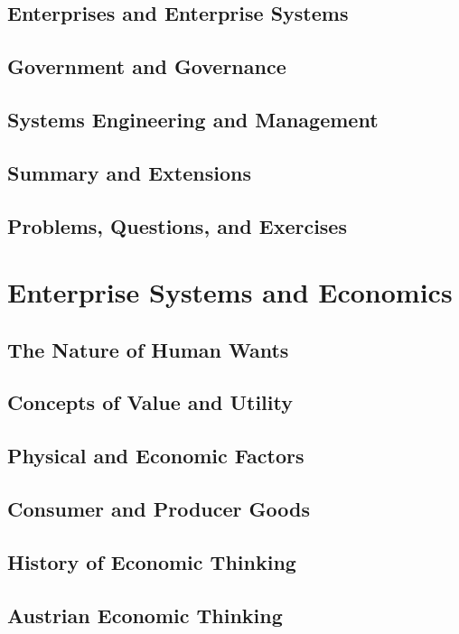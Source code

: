 \documentclass[11pt,fleqn]{book} %
\begin{document}
    \section{Enterprises and Enterprise Systems}
    \section{Government and Governance}
    \section{Systems Engineering and Management}
    \section*{Summary and Extensions}
    \section*{Problems, Questions, and Exercises}
  
  \chapter{Enterprise Systems and Economics}
  \label{ch:enterprise-systems-and}
    \section{The Nature of Human Wants}
    \section{Concepts of Value and Utility}
    \section{Physical and Economic Factors}
    \section{Consumer and Producer Goods}
    \section{History of Economic Thinking}
    \section{Austrian Economic Thinking}
\end{document}
